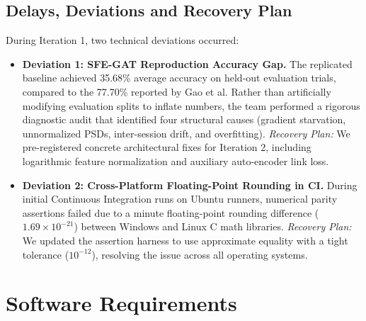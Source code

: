 \documentclass[12pt,a4paper]{report}
\begin{document}
\section{Delays, Deviations and Recovery Plan}
During Iteration 1, two technical deviations occurred:
\begin{itemize}[leftmargin=1.5em]
    \item \textbf{Deviation 1: SFE-GAT Reproduction Accuracy Gap.} The replicated baseline achieved 35.68\% average accuracy on held-out evaluation trials, compared to the 77.70\% reported by Gao et al. Rather than artificially modifying evaluation splits to inflate numbers, the team performed a rigorous diagnostic audit that identified four structural causes (gradient starvation, unnormalized PSDs, inter-session drift, and overfitting). \textit{Recovery Plan:} We pre-registered concrete architectural fixes for Iteration 2, including logarithmic feature normalization and auxiliary auto-encoder link loss.
    \item \textbf{Deviation 2: Cross-Platform Floating-Point Rounding in CI.} During initial Continuous Integration runs on Ubuntu runners, numerical parity assertions failed due to a minute floating-point rounding difference ($1.69 \times 10^{-21}$) between Windows and Linux C math libraries. \textit{Recovery Plan:} We updated the assertion harness to use approximate equality with a tight tolerance ($10^{-12}$), resolving the issue across all operating systems.
\end{itemize}

\chapter{Software Requirements}
\end{document}
